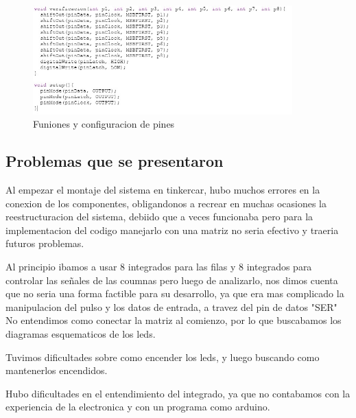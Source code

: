 \documentclass{article}
\begin{document}
\begin{figure}[h]
\includegraphics[width=10cm]{Funciones y configuracion de pines.jpeg}
\centering
\caption{Funiones y configuracion de pines}
\label{fig:gestion}
\end{figure}



 \vspace{5cm}




\subsection{Problemas que se presentaron}

Al empezar el montaje del sistema en tinkercar, hubo muchos errores en la conexion de los componentes, obligandonos a recrear en muchas ocasiones la reestructuracion del sistema, debiido que a veces funcionaba pero para la implementacion del codigo manejarlo con una matriz no seria efectivo y traeria futuros problemas.
 \vspace{1cm}
 
  \vspace{1cm}
 
 Al principio ibamos a usar 8 integrados para las filas y 8 integrados para controlar las señales de las coumnas pero luego de analizarlo, nos dimos cuenta que no seria una forma factible para su desarrollo, ya que era mas complicado la manipulacion del pulso y los datos de entrada, a travez del pin de datos "SER"
No entendimos como conectar la matriz al comienzo, por lo que buscabamos los diagramas esquematicos de los leds. 
 \vspace{1cm}


Tuvimos dificultades sobre como encender los leds, y luego buscando como mantenerlos encendidos.
 \vspace{1cm}

Hubo dificultades en el entendimiento del integrado, ya que no contabamos con la experiencia de la electronica y con un programa como arduino.
 \vspace{1cm}
\end{document}
